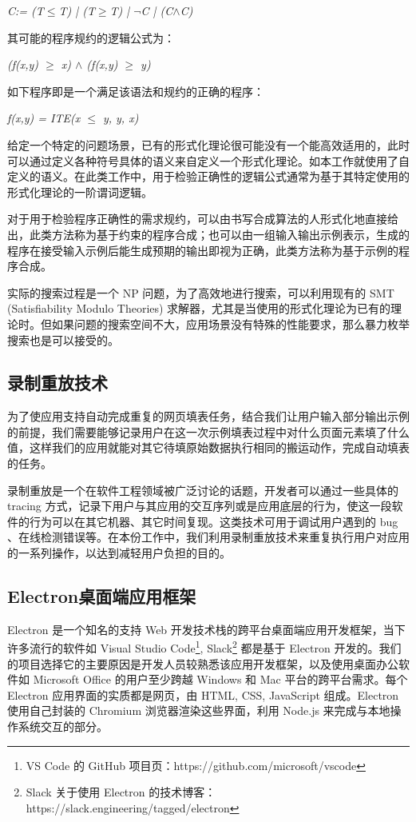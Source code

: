 \documentclass[design, pageheader]{njubachelor}
\begin{document}
{\itshape C:= (T$\leq$T) | (T$\geq$T) | $\neg$C | (C$\wedge$C)}

其可能的程序规约的逻辑公式为：

{\itshape (f(x,y) $\geq$ x) $\wedge$ (f(x,y) $\geq$ y) }

如下程序即是一个满足该语法和规约的正确的程序：

{\itshape f(x,y) = ITE(x $\leq$ y, y, x)}

给定一个特定的问题场景，已有的形式化理论很可能没有一个能高效适用的，此时可以通过定义各种符号具体的语义来自定义一个形式化理论。如本工作就使用了自定义的语义。在此类工作中，用于检验正确性的逻辑公式通常为基于其特定使用的形式化理论的一阶谓词逻辑。

对于用于检验程序正确性的需求规约，可以由书写合成算法的人形式化地直接给出，此类方法称为基于约束的程序合成；也可以由一组输入输出示例表示，生成的程序在接受输入示例后能生成预期的输出即视为正确，此类方法称为基于示例的程序合成。

实际的搜索过程是一个 NP 问题，为了高效地进行搜索，可以利用现有的 SMT (Satisfiability Modulo Theories) 求解器，尤其是当使用的形式化理论为已有的理论时。但如果问题的搜索空间不大，应用场景没有特殊的性能要求，那么暴力枚举搜索也是可以接受的。

\subsection{录制重放技术}
为了使应用支持自动完成重复的网页填表任务，结合我们让用户输入部分输出示例的前提，我们需要能够记录用户在这一次示例填表过程中对什么页面元素填了什么值，这样我们的应用就能对其它待填原始数据执行相同的搬运动作，完成自动填表的任务。

录制重放是一个在软件工程领域被广泛讨论的话题，开发者可以通过一些具体的 tracing 方式，记录下用户与其应用的交互序列或是应用底层的行为，使这一段软件的行为可以在其它机器、其它时间复现。这类技术可用于调试用户遇到的 bug \cite{burg13}、在线检测错误\cite{ronsse99}等。在本份工作中，我们利用录制重放技术来重复执行用户对应用的一系列操作，以达到减轻用户负担的目的。

\subsection{Electron桌面端应用框架}
Electron 是一个知名的支持 Web 开发技术栈的跨平台桌面端应用开发框架，当下许多流行的软件如 Visual Studio Code\footnote{VS Code 的 GitHub 项目页：https://github.com/microsoft/vscode}, Slack\footnote{Slack 关于使用 Electron 的技术博客：https://slack.engineering/tagged/electron} 都是基于 Electron 开发的。我们的项目选择它的主要原因是开发人员较熟悉该应用开发框架，以及使用桌面办公软件如 Microsoft Office 的用户至少跨越 Windows 和 Mac 平台的跨平台需求。每个 Electron 应用界面的实质都是网页，由 HTML, CSS, JavaScript 组成。Electron 使用自己封装的 Chromium 浏览器渲染这些界面，利用 Node.js 来完成与本地操作系统交互的部分。
\end{document}
